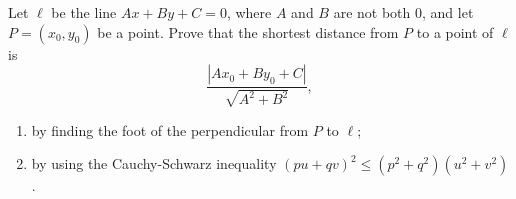 Let $\ell$ be the line $Ax+By+C=0$, where $A$ and $B$ are not both $0$, and let $P=(x_0,y_0)$ be a point. Prove that the shortest distance from $P$ to a point of $\ell$ is
\[\dfrac{\left|Ax_0+By_0+C\right|}{\sqrt{A^2+B^2}},\]
\begin{enumerate}
\item[(a)] by finding the foot of the perpendicular from $P$ to $\ell$;
\item[(b)] by using the Cauchy-Schwarz inequality $(pu+qv)^2\le\left(p^2+q^2\right)\left(u^2+v^2\right)$.
\end{enumerate}
